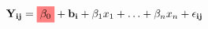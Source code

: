 \documentclass{article}
\newcommand{\highlight}[1]{%
  \colorbox{red!50}{$\displaystyle#1$}}
\begin{document}
\begin{equation}
    \mathbf{Y_{ij}} = \highlight{\beta_{0}} +\mathbf{ b_i} + \beta_1x_1 + \ldots + \beta_nx_n + \mathbf{\epsilon_{ij}}
\end{equation}
\end{document}
